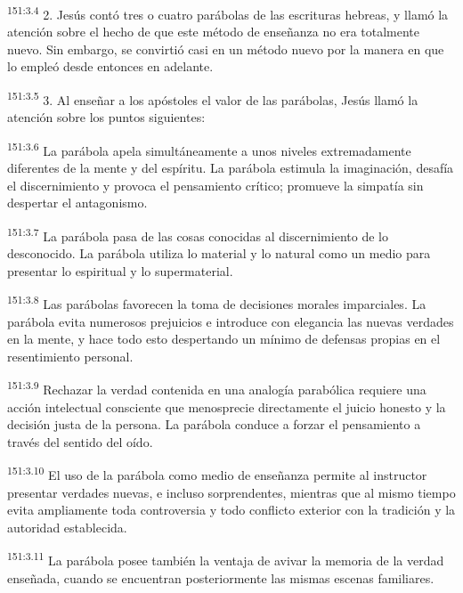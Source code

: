 \par 
\textsuperscript{151:3.4} 2. Jesús contó tres o cuatro parábolas de las escrituras hebreas, y llamó la atención sobre el hecho de que este método de enseñanza no era totalmente nuevo. Sin embargo, se convirtió casi en un método nuevo por la manera en que lo empleó desde entonces en adelante.

\par 
\textsuperscript{151:3.5} 3. Al enseñar a los apóstoles el valor de las parábolas, Jesús llamó la atención sobre los puntos siguientes:

\par 
\textsuperscript{151:3.6} La parábola apela simultáneamente a unos niveles extremadamente diferentes de la mente y del espíritu. La parábola estimula la imaginación, desafía el discernimiento y provoca el pensamiento crítico; promueve la simpatía sin despertar el antagonismo.

\par 
\textsuperscript{151:3.7} La parábola pasa de las cosas conocidas al discernimiento de lo desconocido. La parábola utiliza lo material y lo natural como un medio para presentar lo espiritual y lo supermaterial.

\par 
\textsuperscript{151:3.8} Las parábolas favorecen la toma de decisiones morales imparciales. La parábola evita numerosos prejuicios e introduce con elegancia las nuevas verdades en la mente, y hace todo esto despertando un mínimo de defensas propias en el resentimiento personal.

\par 
\textsuperscript{151:3.9} Rechazar la verdad contenida en una analogía parabólica requiere una acción intelectual consciente que menosprecie directamente el juicio honesto y la decisión justa de la persona. La parábola conduce a forzar el pensamiento a través del sentido del oído.

\par 
\textsuperscript{151:3.10} El uso de la parábola como medio de enseñanza permite al instructor presentar verdades nuevas, e incluso sorprendentes, mientras que al mismo tiempo evita ampliamente toda controversia y todo conflicto exterior con la tradición y la autoridad establecida.

\par 
\textsuperscript{151:3.11} La parábola posee también la ventaja de avivar la memoria de la verdad enseñada, cuando se encuentran posteriormente las mismas escenas familiares.

